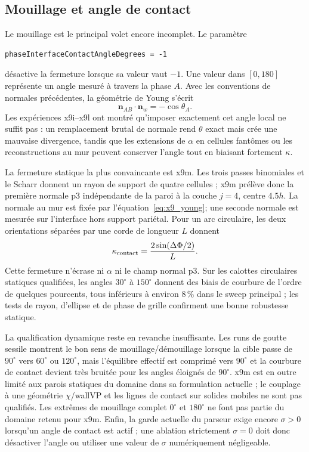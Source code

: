 \documentclass[11pt,a4paper]{article}
\begin{document}
\subsection{Mouillage et angle de contact}

Le mouillage est le principal volet encore incomplet. Le paramètre
\begin{verbatim}
phaseInterfaceContactAngleDegrees = -1
\end{verbatim}
désactive la fermeture lorsque sa valeur vaut $-1$. Une valeur dans $[0,180]$ représente un angle mesuré à travers la phase $A$. Avec les conventions de normales précédentes, la géométrie de Young s'écrit
\begin{equation}
  \bm n_{AB}\cdot\bm n_w=-\cos\theta_A.
  \label{eq:x9_young}
\end{equation}
Les expériences x9i--x9l ont montré qu'imposer exactement cet angle local ne suffit pas : un remplacement brutal de normale rend $\theta$ exact mais crée une mauvaise divergence, tandis que les extensions de $\alpha$ en cellules fantômes ou les reconstructions au mur peuvent conserver l'angle tout en biaisant fortement $\kappa$.

La fermeture statique la plus convaincante est x9m. Les trois passes binomiales et le Scharr donnent un rayon de support de quatre cellules ; x9m prélève donc la première normale p3 indépendante de la paroi à la couche $j=4$, centre $4.5h$. La normale au mur est fixée par l'équation~\eqref{eq:x9_young}; une seconde normale est mesurée sur l'interface hors support pariétal. Pour un arc circulaire, les deux orientations séparées par une corde de longueur $L$ donnent
\begin{equation}
  \kappa_{\rm contact}
  =\frac{2\sin(\Delta\Phi/2)}{L}.
  \label{eq:x9m_secant_curvature}
\end{equation}
Cette fermeture n'écrase ni $\alpha$ ni le champ normal p3. Sur les calottes circulaires statiques qualifiées, les angles $30^\circ$ à $150^\circ$ donnent des biais de courbure de l'ordre de quelques pourcents, tous inférieurs à environ $8\,\%$ dans le sweep principal ; les tests de rayon, d'ellipse et de phase de grille confirment une bonne robustesse statique.

La qualification dynamique reste en revanche insuffisante. Les runs de goutte sessile montrent le bon sens de mouillage/démouillage lorsque la cible passe de $90^\circ$ vers $60^\circ$ ou $120^\circ$, mais l'équilibre effectif est comprimé vers $90^\circ$ et la courbure de contact devient très bruitée pour les angles éloignés de $90^\circ$. x9m est en outre limité aux parois statiques du domaine dans sa formulation actuelle ; le couplage à une géométrie $\chi$/wallVP et les lignes de contact sur solides mobiles ne sont pas qualifiés. Les extrêmes de mouillage complet $0^\circ$ et $180^\circ$ ne font pas partie du domaine retenu pour x9m. Enfin, la garde actuelle du parseur exige encore $\sigma>0$ lorsqu'un angle de contact est actif ; une ablation strictement $\sigma=0$ doit donc désactiver l'angle ou utiliser une valeur de $\sigma$ numériquement négligeable.
\end{document}
